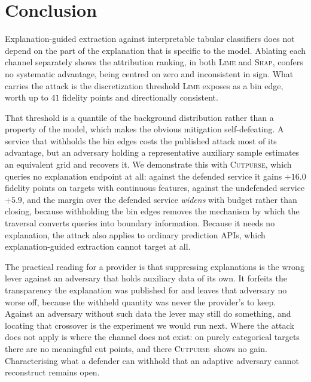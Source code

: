 \documentclass[sigconf,anonymous,review]{acmart}
\newcommand{\sys}{\textsc{Cutpurse}}
\begin{document}
\section{Conclusion}
Explanation-guided extraction against interpretable tabular classifiers does not depend on the part of
the explanation that is specific to the model. Ablating each channel separately shows the attribution
ranking, in both \textsc{Lime} and \textsc{Shap}, confers no systematic advantage, being centred on
zero and inconsistent in sign. What carries the attack is the discretization threshold \textsc{Lime}
exposes as a bin edge, worth up to $41$ fidelity points and directionally consistent.

That threshold is a quantile of the background distribution rather than a property of the model, which
makes the obvious mitigation self-defeating. A service that withholds the bin edges costs the
published attack most of its advantage, but an adversary holding a representative auxiliary sample
estimates an equivalent grid and recovers it. We demonstrate this with \sys, which queries no
explanation endpoint at all: against the defended service it gains $+16.0$ fidelity points on targets
with continuous features, against the undefended service $+5.9$, and the margin over the defended
service \emph{widens} with budget rather than closing, because withholding the bin edges removes the
mechanism by which the traversal converts queries into boundary information. Because it needs no
explanation, the attack also applies to ordinary prediction APIs, which explanation-guided extraction
cannot target at all.

The practical reading for a provider is that suppressing explanations is the wrong lever against an
adversary that holds auxiliary data of its own. It forfeits the transparency the explanation was
published for and leaves that adversary no worse off, because the withheld quantity was never the
provider's to keep. Against an adversary without such data the lever may still do something, and
locating that crossover is the experiment we would run next. Where the attack does not apply is where the
channel does not exist: on purely categorical targets there are no meaningful cut points, and there
\sys\ shows no gain. Characterising what a defender can withhold that an adaptive adversary cannot
reconstruct remains open.

\appendix
\end{document}
